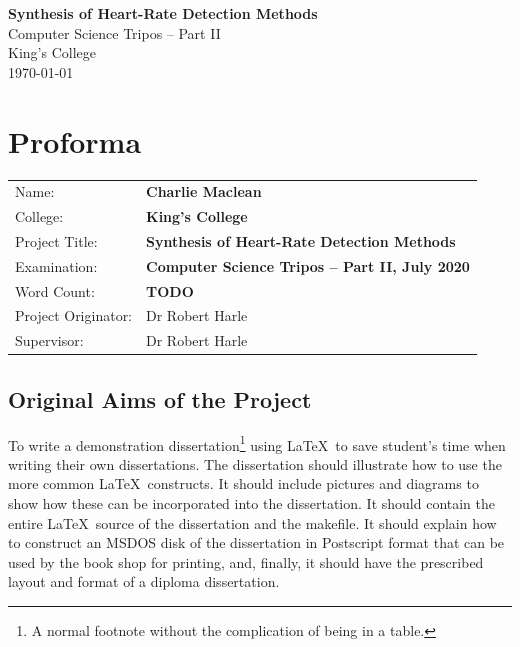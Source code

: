 \documentclass[12pt,a4paper,twoside,openright]{report}
\begin{document}





\pagestyle{empty}


\vspace*{60mm}
\begin{center}
\Huge
\textbf{Synthesis of Heart-Rate Detection Methods} \\[5mm]
Computer Science Tripos -- Part II \\[5mm]
King's College \\[5mm]
\today  %
\end{center}


\pagestyle{plain}

\chapter*{Proforma}

{\large
\begin{tabular}{ll}
Name:               & \bf Charlie Maclean                       \\
College:            & \bf King's College			\\
Project Title:      & \bf Synthesis of Heart-Rate Detection Methods	 \\
Examination:        & \bf Computer Science Tripos -- Part II, July 2020  \\
Word Count:         & \bf TODO\footnotemark[1]		\\
Project Originator: & Dr Robert Harle                   \\
Supervisor:         & Dr Robert Harle                   \\ 
\end{tabular}
}


\section*{Original Aims of the Project}

To write a demonstration dissertation\footnote{A normal footnote without the
complication of being in a table.} using \LaTeX\ to save
student's time when writing their own dissertations. The dissertation
should illustrate how to use the more common \LaTeX\ constructs. It
should include pictures and diagrams to show how these can be
incorporated into the dissertation.  It should contain the entire
\LaTeX\ source of the dissertation and the makefile.  It should
explain how to construct an MSDOS disk of the dissertation in
Postscript format that can be used by the book shop for printing, and,
finally, it should have the prescribed layout and format of a diploma
dissertation.
\end{document}
